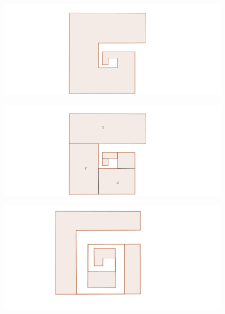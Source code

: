 \documentclass{beamer}
\begin{document}
\begin{frame}
\begin{figure}[h]
\includegraphics[width=\textwidth]{Poligono-sin-planos}
\end{figure}
\end{frame}
\begin{frame}
\begin{figure}[h]
\includegraphics[width=\textwidth]{Poligono-sin-planos-2}
\end{figure}
\end{frame}
\begin{frame}
\begin{figure}[h]
\includegraphics[width=\textwidth]{Poligono-con-planos}
\end{figure}
\end{frame}
\end{document}
